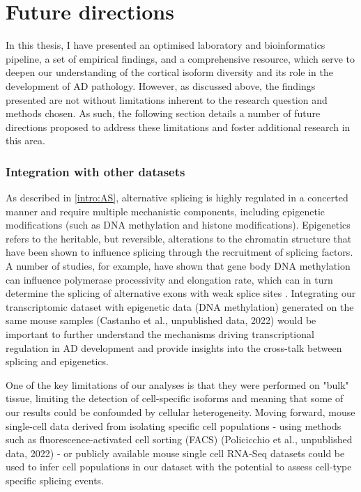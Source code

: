 \section{Future directions}
In this thesis, I have presented an optimised laboratory and bioinformatics pipeline, a set of empirical findings, and a comprehensive resource, which serve to deepen our understanding of the cortical isoform diversity and its role in the development of AD pathology. However, as discussed above, the findings presented are not without limitations inherent to the research question and methods chosen. As such, the following section details a number of future directions proposed to address these limitations and foster additional research in this area.   

\subsubsection{Integration with other datasets} 
As described in \cref{intro:AS}, alternative splicing is highly regulated in a concerted manner and require multiple mechanistic components, including epigenetic modifications (such as DNA methylation and histone modifications). Epigenetics refers to the heritable, but reversible, alterations to the chromatin structure that have been shown to influence splicing through the recruitment of splicing factors\cite{Yang2014, Shukla2011, Zhang2020a, Shukla2011, Luco2011}. A number of studies, for example, have shown that gene body DNA methylation can influence polymerase processivity and elongation rate, which can in turn determine the splicing of alternative exons with weak splice sites \cite{Yang2014, Shukla2011}. Integrating our transcriptomic dataset with epigenetic data (DNA methylation) generated on the same mouse samples (Castanho et al., unpublished data, 2022) would be important to further understand the mechanisms driving transcriptional regulation in AD development and provide insights into the cross-talk between splicing and epigenetics. 

One of the key limitations of our analyses is that they were performed on "bulk" tissue, limiting the detection of cell-specific isoforms and meaning that some of our results could be confounded by cellular heterogeneity. Moving forward, mouse single-cell data derived from isolating specific cell populations - using methods such as fluorescence-activated cell sorting (FACS) (Policicchio et al., unpublished data, 2022) - or publicly available mouse single cell RNA-Seq datasets could be used to infer cell populations in our dataset with the potential to assess cell-type specific splicing events.   

